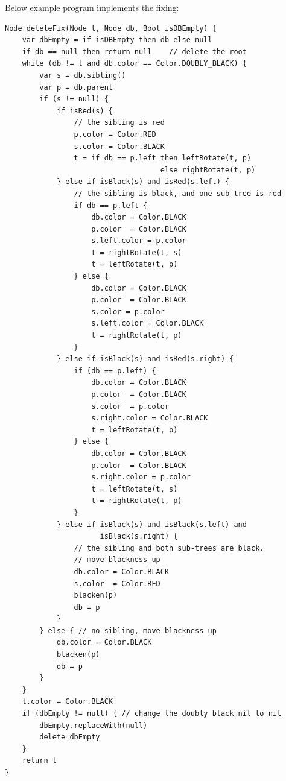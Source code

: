 \documentclass[b5paper]{article}
\begin{document}
Below example program implements the fixing:

\begin{lstlisting}[language = Bourbaki]
Node deleteFix(Node t, Node db, Bool isDBEmpty) {
    var dbEmpty = if isDBEmpty then db else null
    if db == null then return null    // delete the root
    while (db != t and db.color == Color.DOUBLY_BLACK) {
        var s = db.sibling()
        var p = db.parent
        if (s != null) {
            if isRed(s) {
                // the sibling is red
                p.color = Color.RED
                s.color = Color.BLACK
                t = if db == p.left then leftRotate(t, p)
                                    else rightRotate(t, p)
            } else if isBlack(s) and isRed(s.left) {
                // the sibling is black, and one sub-tree is red
                if db == p.left {
                    db.color = Color.BLACK
                    p.color  = Color.BLACK
                    s.left.color = p.color
                    t = rightRotate(t, s)
                    t = leftRotate(t, p)
                } else {
                    db.color = Color.BLACK
                    p.color  = Color.BLACK
                    s.color = p.color
                    s.left.color = Color.BLACK
                    t = rightRotate(t, p)
                }
            } else if isBlack(s) and isRed(s.right) {
                if (db == p.left) {
                    db.color = Color.BLACK
                    p.color  = Color.BLACK
                    s.color  = p.color
                    s.right.color = Color.BLACK
                    t = leftRotate(t, p)
                } else {
                    db.color = Color.BLACK
                    p.color  = Color.BLACK
                    s.right.color = p.color
                    t = leftRotate(t, s)
                    t = rightRotate(t, p)
                }
            } else if isBlack(s) and isBlack(s.left) and
                      isBlack(s.right) {
                // the sibling and both sub-trees are black.
                // move blackness up
                db.color = Color.BLACK
                s.color  = Color.RED
                blacken(p)
                db = p
            }
        } else { // no sibling, move blackness up
            db.color = Color.BLACK
            blacken(p)
            db = p
        }
    }
    t.color = Color.BLACK
    if (dbEmpty != null) { // change the doubly black nil to nil
        dbEmpty.replaceWith(null)
        delete dbEmpty
    }
    return t
}
\end{lstlisting}
\end{document}
